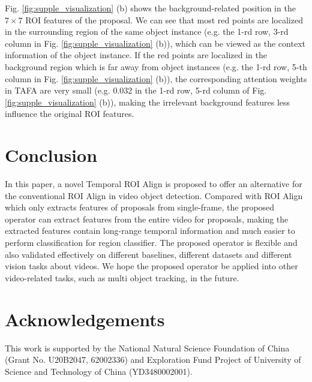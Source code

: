 \documentclass[letterpaper]{article} \usepackage{aaai21}  \usepackage{times}  \usepackage{helvet} \usepackage{courier}  \usepackage[hyphens]{url}  \usepackage{graphicx} \usepackage{hyperref}
\begin{document}
Fig. \ref{fig:supple_visualization} (b) shows the background-related position in the $7\times 7$ ROI features of the proposal. We can see that most red points are localized in the surrounding region of the same object instance (e.g. the 1-rd row, 3-rd column in Fig. \ref{fig:supple_visualization} (b)), which can be viewed as the context information of the object instance. If the red points are localized in the background region which is far away from object instances (e.g. the 1-rd row, 5-th column in Fig. \ref{fig:supple_visualization} (b)), the corresponding attention weights in TAFA are very small (e.g. 0.032 in the 1-rd row, 5-rd column of Fig. \ref{fig:supple_visualization} (b)), making the irrelevant background features less influence the original ROI features.
 \section{Conclusion}


In this paper, a novel Temporal ROI Align is proposed to offer an alternative for the conventional ROI Align in video object detection. Compared with ROI Align which only extracts features of proposals from single-frame, the proposed operator can extract features from the entire video for proposals, making the extracted features contain long-range temporal information and much easier to perform classification for region classifier. The proposed operator is flexible and also validated effectively on different baselines, different datasets and different vision tasks about videos. We hope the proposed operator be applied into other video-related tasks, such as multi object tracking, in the future. 
%
 
\section{Acknowledgements}
This work is supported by the National Natural Science Foundation of China (Grant No. U20B2047, 62002336) and Exploration Fund Project of University of Science and Technology of China (YD3480002001).



\end{document}
